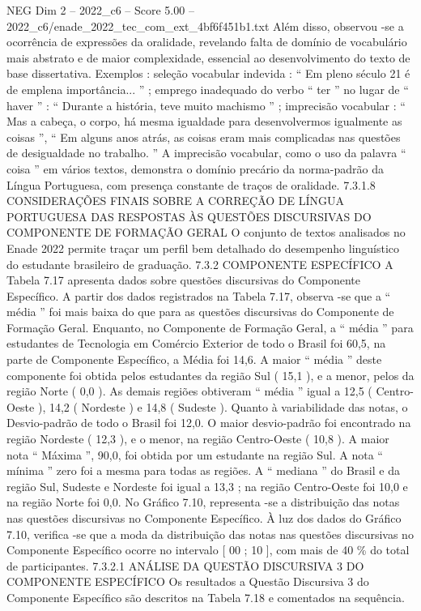 \begin{textsample}{NEG Dim 2 – 2022\_c6 – Score 5.00 – 2022\_c6/enade\_2022\_tec\_com\_ext\_4bf6f451b1.txt}
Além disso, observou -se a ocorrência de expressões da oralidade, revelando falta de domínio de vocabulário mais abstrato e de maior complexidade, essencial ao desenvolvimento do texto de base dissertativa.
Exemplos : seleção vocabular indevida : “ Em pleno século 21 é de emplena importância... ” ; emprego inadequado do verbo “ ter ” no lugar de “ haver ” : “ Durante a história, teve muito machismo ” ; imprecisão vocabular : “ Mas a cabeça, o corpo, há mesma igualdade para desenvolvermos igualmente as coisas ”, “ Em alguns anos atrás, as coisas eram mais complicadas nas questões de desigualdade no trabalho. ” A imprecisão vocabular, como o uso da palavra “ coisa ” em vários textos, demonstra o domínio precário da norma-padrão da Língua Portuguesa, com presença constante de traços de oralidade. 7.3.1.8 CONSIDERAÇÕES FINAIS SOBRE A CORREÇÃO DE LÍNGUA PORTUGUESA DAS RESPOSTAS ÀS QUESTÕES DISCURSIVAS DO COMPONENTE DE FORMAÇÃO GERAL O conjunto de textos analisados no Enade 2022 permite traçar um perfil bem detalhado do desempenho linguístico do estudante brasileiro de graduação. 7.3.2 COMPONENTE ESPECÍFICO A Tabela 7.17 apresenta dados sobre questões discursivas do Componente Específico.
A partir dos dados registrados na Tabela 7.17, observa -se que a “ média ” foi mais baixa do que para as questões discursivas do Componente de Formação Geral.
Enquanto, no Componente de Formação Geral, a “ média ” para estudantes de Tecnologia em Comércio Exterior de todo o Brasil foi 60,5, na parte de Componente Específico, a Média foi 14,6.
A maior “ média ” deste componente foi obtida pelos estudantes da região Sul ( 15,1 ), e a menor, pelos da região Norte ( 0,0 ).
As demais regiões obtiveram “ média ” igual a 12,5 ( Centro-Oeste ), 14,2 ( Nordeste ) e 14,8 ( Sudeste ).
Quanto à variabilidade das notas, o Desvio-padrão de todo o Brasil foi 12,0.
O maior desvio-padrão foi encontrado na região Nordeste ( 12,3 ), e o menor, na região Centro-Oeste ( 10,8 ).
A maior nota “ Máxima ”, 90,0, foi obtida por um estudante na região Sul.
A nota “ mínima ” zero foi a mesma para todas as regiões.
A “ mediana ” do Brasil e da região Sul, Sudeste e Nordeste foi igual a 13,3 ; na região Centro-Oeste foi 10,0 e na região Norte foi 0,0.
No Gráfico 7.10, representa -se a distribuição das notas nas questões discursivas no Componente Específico.
À luz dos dados do Gráfico 7.10, verifica -se que a moda da distribuição das notas nas questões discursivas no Componente Específico ocorre no intervalo [ 00 ; 10 ], com mais de 40 \% do total de participantes. 7.3.2.1 ANÁLISE DA QUESTÃO DISCURSIVA 3 DO COMPONENTE ESPECÍFICO Os resultados a Questão Discursiva 3 do Componente Específico são descritos na Tabela 7.18 e comentados na sequência.

\end{textsample}
